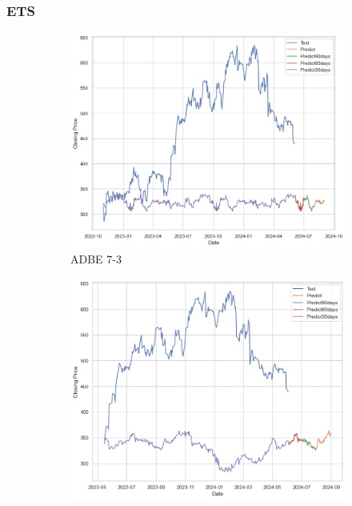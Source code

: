 \documentclass{ieeeojies}
\begin{document}
\subsubsection{ETS}
\begin{figure}[H]
    \centering
    \begin{subfigure}[b]{0.33\linewidth}
        \centering
        \includegraphics[width=\linewidth]{ETS Plot/ADBE_ETS_7_3.png}
        \caption{ADBE 7-3}
        \label{fig:adbe-7-3}
    \end{subfigure}%
    \hfill
    \begin{subfigure}[b]{0.33\linewidth}
        \centering
        \includegraphics[width=\linewidth]{ETS Plot/ADBE_ETS_8_2.png}

\end{subfigure}
\end{figure}
\end{document}
